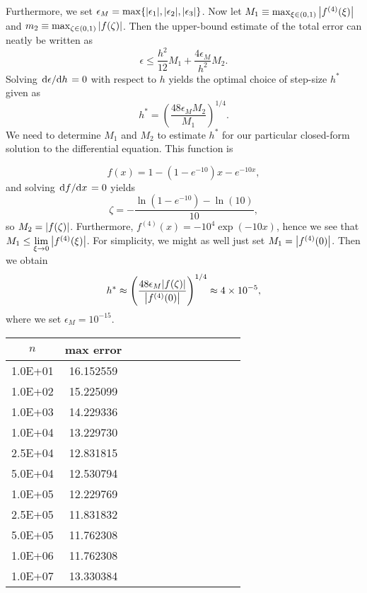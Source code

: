 \documentclass[english,notitlepage]{revtex4-1}  %
\begin{document}
Furthermore, we set $\epsilon_M = \max\{\abs{\epsilon_1}, \abs{\epsilon_2}, \abs{\epsilon_3}\}$. Now let $M_1 \equiv \max_{\xi \in (0,1)}\abs{f^{(4)}(\xi)}$ and 
$m_2 \equiv \max_{\zeta \in (0,1)}\abs{f(\zeta)}$. Then the upper-bound estimate of the total error can neatly be written as
\begin{equation}
	\epsilon \leq \frac{h^2}{12}M_1 + \frac{4\epsilon_M}{h^2}M_2.
\end{equation}
Solving $\dv*{\epsilon}{h} = 0$ with respect to $h$ yields the optimal choice of step-size $h^*$ given as  
\begin{equation}\label{optimal_stepsize}
	h^* = \left(\frac{48\epsilon_M M_2}{M_1}\right)^{1/4}.
\end{equation}
We need to determine $M_1$ and $M_2$ to estimate $h^*$ for our particular closed-form solution to the differential equation. This function is 

\begin{equation}
	f(x) = 1-(1-e^{-10})x - e^{-10x},
\end{equation}
and solving $\dv*{f}{x} = 0$ yields 
\begin{equation}
	\zeta = -\frac{\ln(1-e^{-10}) - \ln(10)}{10},
\end{equation}
so $M_2 = \abs{f(\zeta)}$.
Furthermore, $f^{(4)}(x) = -10^4\exp(-10x)$, hence we see that $M_1 \leq \lim\limits_{\xi \to 0}\abs{f^{(4)}(\xi)}$. For simplicity, we might as well just set $M_1 = \abs{f^{(4)}(0)}$. Then we obtain 
\begin{equation}
	h^* \approx \left(\frac{48\epsilon_M \abs{f(\zeta)}}{\abs{f^{(4)}(0)}}\right)^{1/4} \approx 4\times 10^{-5},
\end{equation}
where we set $\epsilon_M = 10^{-15}$.

\begin{table}
\centering
\begin{tabular}{|c|c|c|c|c|c|c|c|c|c|c|c|}
	\hline
	$n$ &max error\\
	\hline
	1.0E+01&16.152559\\
	\hline
	1.0E+02&15.225099\\
	\hline
	1.0E+03&14.229336\\
	\hline
	1.0E+04&13.229730\\
	\hline
	2.5E+04&12.831815\\
	\hline
	5.0E+04&12.530794\\
	\hline
	1.0E+05&12.229769\\
	\hline
	2.5E+05&11.831832\\
	\hline
	5.0E+05&11.762308\\
	\hline
	1.0E+06&11.762308\\
	\hline
	1.0E+07&13.330384\\
	\hline
\end{tabular}
\end{table}
\end{document}
